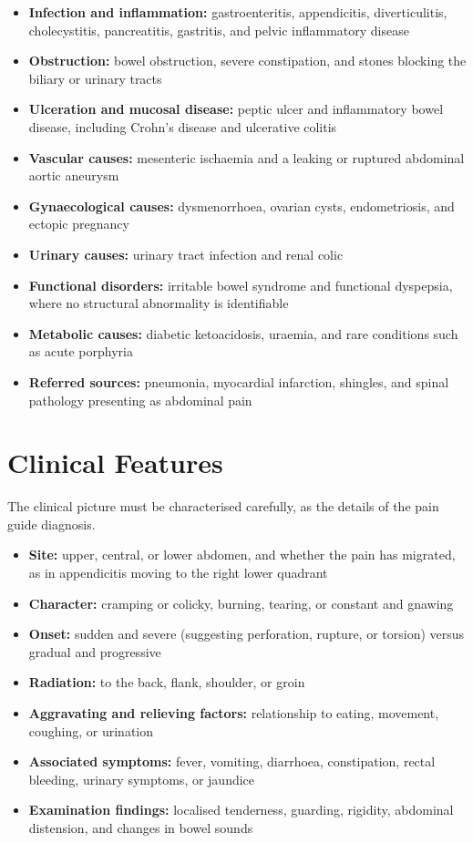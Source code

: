 \begin{itemize}
    \item \textbf{Infection and inflammation:} gastroenteritis, appendicitis, diverticulitis, cholecystitis, pancreatitis, gastritis, and pelvic inflammatory disease
    \item \textbf{Obstruction:} bowel obstruction, severe constipation, and stones blocking the biliary or urinary tracts
    \item \textbf{Ulceration and mucosal disease:} peptic ulcer and inflammatory bowel disease, including Crohn's disease and ulcerative colitis
    \item \textbf{Vascular causes:} mesenteric ischaemia and a leaking or ruptured abdominal aortic aneurysm
    \item \textbf{Gynaecological causes:} dysmenorrhoea, ovarian cysts, endometriosis, and ectopic pregnancy
    \item \textbf{Urinary causes:} urinary tract infection and renal colic
    \item \textbf{Functional disorders:} irritable bowel syndrome and functional dyspepsia, where no structural abnormality is identifiable
    \item \textbf{Metabolic causes:} diabetic ketoacidosis, uraemia, and rare conditions such as acute porphyria
    \item \textbf{Referred sources:} pneumonia, myocardial infarction, shingles, and spinal pathology presenting as abdominal pain
\end{itemize}

\section*{Clinical Features}
The clinical picture must be characterised carefully, as the details of the pain guide diagnosis.

\begin{itemize}
    \item \textbf{Site:} upper, central, or lower abdomen, and whether the pain has migrated, as in appendicitis moving to the right lower quadrant
    \item \textbf{Character:} cramping or colicky, burning, tearing, or constant and gnawing
    \item \textbf{Onset:} sudden and severe (suggesting perforation, rupture, or torsion) versus gradual and progressive
    \item \textbf{Radiation:} to the back, flank, shoulder, or groin
    \item \textbf{Aggravating and relieving factors:} relationship to eating, movement, coughing, or urination
    \item \textbf{Associated symptoms:} fever, vomiting, diarrhoea, constipation, rectal bleeding, urinary symptoms, or jaundice
    \item \textbf{Examination findings:} localised tenderness, guarding, rigidity, abdominal distension, and changes in bowel sounds
\end{itemize}

